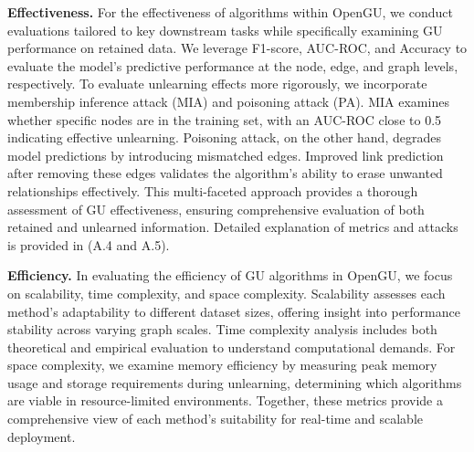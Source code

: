  \textbf{Effectiveness.}
For the effectiveness of algorithms within OpenGU, we conduct evaluations tailored to key downstream tasks while specifically examining GU performance on retained data. We leverage F1-score, AUC-ROC, and Accuracy to evaluate the model's predictive performance at the node, edge, and graph levels, respectively. To evaluate unlearning effects more rigorously, we incorporate membership inference attack (MIA) and poisoning attack (PA). MIA examines whether specific nodes are in the training set, with an AUC-ROC close to 0.5 indicating effective unlearning. Poisoning attack, on the other hand, degrades model predictions by introducing mismatched edges. Improved link prediction after removing these edges validates the algorithm’s ability to erase unwanted relationships effectively. This multi-faceted approach provides a thorough assessment of GU effectiveness, ensuring comprehensive evaluation of both retained and unlearned information. Detailed explanation of metrics and attacks is provided in \cite{OpenGU2025} (A.4 and A.5).



 \textbf{Efficiency.} 
In evaluating the efficiency of GU algorithms in OpenGU, we focus on scalability, time complexity, and space complexity. Scalability assesses each method’s adaptability to different dataset sizes, offering insight into performance stability across varying graph scales. Time complexity analysis includes both theoretical and empirical evaluation to understand computational demands. For space complexity, we examine memory efficiency by measuring peak memory usage and storage requirements during unlearning, determining which algorithms are viable in resource-limited environments. Together, these metrics provide a comprehensive view of each method’s suitability for real-time and scalable deployment.




